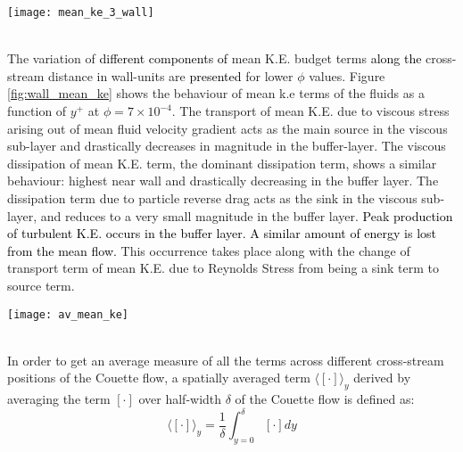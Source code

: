 \documentclass[aip,graphicx]{revtex4-1}
\begin{document}
\begin{figure*}[!]
	\texttt{[image: mean\_ke\_3\_wall]}
		\caption{ Terms of fluid phase mean K.E. as a function of cross-stream position in wall-scaling for $\phi=7\times10^{-4}$}
	\label{fig:wall_mean_ke}
\end{figure*}
\\The variation of \textcolor{black}{different components of} mean K.E. budget terms \textcolor{black}{along the} cross-stream distance in wall-units are \textcolor{black}{presented} for lower $\phi$ values. Figure \ref{fig:wall_mean_ke} shows the behaviour of mean k.e terms of the fluids as a function of $y^+$ at $\phi=7\times10^{-4}$. The transport of mean K.E. due to viscous stress arising out of mean fluid velocity gradient acts as the main source in the viscous sub-layer and drastically decreases in magnitude in the buffer-layer. The viscous dissipation of mean K.E. term, the dominant dissipation term, shows a similar behaviour: highest near wall and drastically decreasing in the buffer layer. The dissipation term due to particle reverse drag acts as the sink in the viscous sub-layer, and reduces to a very small magnitude in the buffer layer. 
\textcolor{black}{Peak production of turbulent K.E. occurs in the buffer layer. A similar amount of energy is lost from the mean flow.}
This occurrence takes place along with the change of transport term of mean K.E. due to Reynolds Stress from being a sink term to source term. 
\begin{figure*}[!]
	\texttt{[image: av\_mean\_ke]}
		\caption{Magnitude of spatially averaged terms of fluid phase mean K.E. as a function of $\phi$}
	\label{fig:av_mean_ke}
\end{figure*}
\\ In order to get an average measure of all the terms across different cross-stream positions of the Couette flow, a spatially averaged term $\langle[\cdot]\rangle_y$ derived by averaging the term $[\cdot]$ over half-width $\delta$ of the Couette flow is defined as: 
\begin{equation}
\label{eq:spatially_averaged}
    \langle  [\cdot] \rangle_y= \frac{1}{\delta}\int_{y=0}^{\delta} [\cdot]dy
\end{equation}
\end{document}
